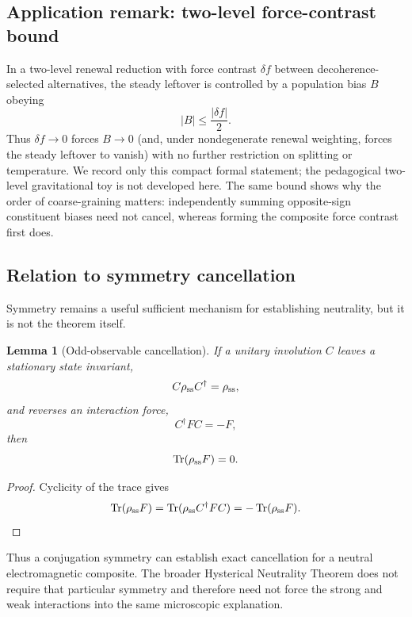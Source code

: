 \documentclass[11pt]{article}
\newtheorem{lemma}[theorem]{Lemma}
\theoremstyle{definition}
\theoremstyle{remark}
\newcommand{\Tr}{\operatorname{Tr}}
\begin{document}
\subsection{Application remark: two-level force-contrast bound}
\label{sec:twolevel-remark}
In a two-level renewal reduction with force contrast $\delta f$ between decoherence-selected alternatives, the steady leftover is controlled by a population bias $B$ obeying
\begin{equation}
 \boxed{|B|\le\frac{|\delta f|}{2}.}
 \label{eq:Bbound}
\end{equation}
Thus $\delta f\to0$ forces $B\to0$ (and, under nondegenerate renewal weighting, forces the steady leftover to vanish) with no further restriction on splitting or temperature.
We record only this compact formal statement; the pedagogical two-level gravitational toy is not developed here.
The same bound shows why the order of coarse-graining matters: independently summing opposite-sign constituent biases need not cancel, whereas forming the composite force contrast first does.

\subsection{Relation to symmetry cancellation}
Symmetry remains a useful sufficient mechanism for establishing neutrality, but it is not the theorem itself.

\begin{lemma}[Odd-observable cancellation]
If a unitary involution $C$ leaves a stationary state invariant,
\begin{equation}
 C\rho_{\rm ss}C^\dagger=\rho_{\rm ss},
\end{equation}
and reverses an interaction force,
\begin{equation}
 C^\dagger F C=-F,
\end{equation}
then
\begin{equation}
 \Tr(\rho_{\rm ss}F)=0.
\end{equation}
\end{lemma}
\begin{proof}
Cyclicity of the trace gives
\begin{equation}
 \Tr(\rho_{\rm ss}F)
 =\Tr(\rho_{\rm ss}C^\dagger FC)
 =-\Tr(\rho_{\rm ss}F).
\end{equation}
\end{proof}

Thus a conjugation symmetry can establish exact cancellation for a neutral electromagnetic composite.  The broader Hysterical Neutrality Theorem does not require that particular symmetry and therefore need not force the strong and weak interactions into the same microscopic explanation.
\end{document}
